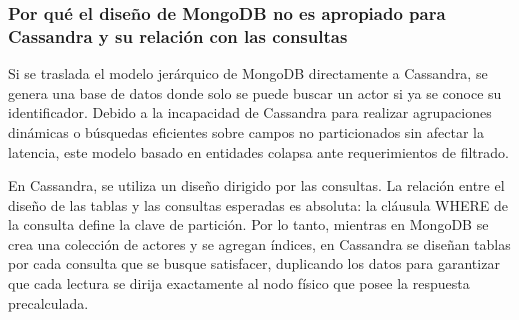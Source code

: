 \documentclass[11pt,a4paper]{article}
\begin{document}
\subsubsection{Por qué el diseño de MongoDB no es apropiado para Cassandra y su relación con las consultas}
Si se traslada el modelo jerárquico de MongoDB directamente a Cassandra, se genera una base de datos donde solo se puede buscar un actor
si ya se conoce su identificador. Debido a la incapacidad de Cassandra para realizar agrupaciones dinámicas o búsquedas eficientes sobre campos 
no particionados sin afectar la latencia, este modelo basado en entidades colapsa ante requerimientos de filtrado.

En Cassandra, se utiliza un diseño dirigido por las consultas. La relación entre el diseño de las tablas y las consultas esperadas es
absoluta: la cláusula WHERE de la consulta define la clave de partición. Por lo tanto, mientras en MongoDB se crea una colección de 
actores y se agregan índices, en Cassandra se diseñan tablas por cada consulta que se busque satisfacer, duplicando los datos para
garantizar que cada lectura se dirija exactamente al nodo físico que posee la respuesta precalculada.
\end{document}
